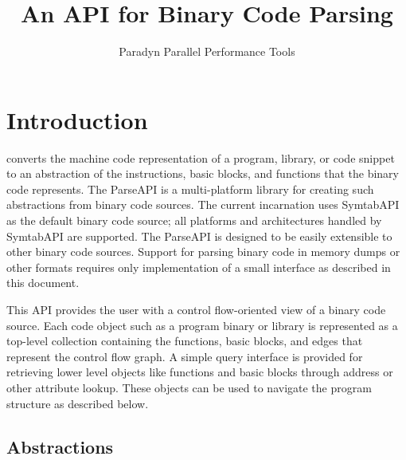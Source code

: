 \documentclass{tufte-handout}
\title{An API for Binary Code Parsing}
\author{Paradyn Parallel Performance Tools}
\begin{document}
\newcommand{\apient}[3]{%
#1 & #2 \\
 & \emph{#3} \\[0.5em]%
} 

\newenvironment{apilist}[1]{\begin{fullwidth}%
\begin{tabular}{p{0.25\linewidth}p{0.75\linewidth}}
{\bf #1} & \\%
}
{\end{tabular}\end{fullwidth}}


\maketitle


\section{Introduction}

 converts the machine code representation of a
program, library, or code snippet to an abstraction of the instructions, basic
blocks, and functions that the binary code represents. The ParseAPI is a
multi-platform library for creating such abstractions from binary code sources.
The current incarnation uses SymtabAPI\cite{symtabsite} as the default binary
code source; all platforms and architectures handled by SymtabAPI are
supported. The ParseAPI is designed to be easily extensible to other binary
code sources. Support for parsing binary code in memory dumps or other formats
requires only implementation of a small interface as described in this
document.

This API provides the user with a control flow-oriented view of a binary code
source. Each code object such as a program binary or library is represented as
a top-level collection containing the functions, basic blocks, and edges that
represent the control flow graph. A simple query interface is provided for
retrieving lower level objects like functions and basic blocks through address
or other attribute lookup. These objects can be used to navigate the 
program structure as described below.

\subsection{Abstractions}
\end{document}
